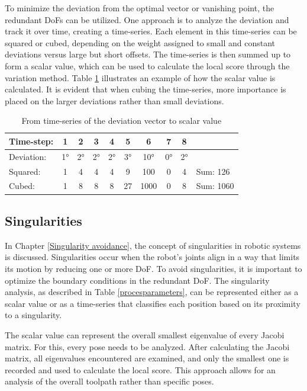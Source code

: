 To minimize the deviation from the optimal vector or vanishing point, the redundant \acrshort{DoF}s can be utilized. One approach is to analyze the deviation and track it over time, creating a time-series. Each element in this time-series can be squared or cubed, depending on the weight assigned to small and constant deviations versus large but short offsets. The time-series is then summed up to form a scalar value, which can be used to calculate the local score through the variation method. Table \ref{deviation} illustrates an example of how the scalar value is calculated. It is evident that when cubing the time-series, more importance is placed on the larger deviations rather than small deviations.


\begin{table}[H]
	\centering
	\begin{tabular}{||l|c|c|c|c|c|c|c|c|l||}
		\hline
		Time-step:  & 1 & 2& 3& 4& 5& 6& 7& 8&  \\
		\hline
		Deviation:  & 1° & 2°& 2°& 2°& 3°& 10°& 0°& 2°&  \\
		\hline
		\hline
		Squared:  & 1 & 4& 4& 4& 9& 100& 0& 4& Sum: 126  \\
		Cubed:  & 1 & 8& 8& 8& 27& 1000& 0& 8& Sum: 1060  \\
		\hline
		\hline
		
	\end{tabular}
	
	\caption{From time-series of the deviation vector to scalar value}
	\label{deviation}
\end{table}

 

\subsection{Singularities}

In Chapter \ref{Singularity avoidance}, the concept of singularities in robotic systems is discussed. Singularities occur when the robot's joints align in a way that limits its motion by reducing one or more \acrshort{DoF}. To avoid singularities, it is important to optimize the boundary conditions in the redundant \acrshort{DoF}. The singularity analysis, as described in Table \ref{procesparameters}, can be represented either as a scalar value or as a time-series that classifies each position based on its proximity to a singularity.

The scalar value can represent the overall smallest eigenvalue of every Jacobi matrix. For this, every pose needs to be analyzed. After calculating the Jacobi matrix, all eigenvalues encountered are examined, and only the smallest one is recorded and used to calculate the local score. This approach allows for an analysis of the overall toolpath rather than specific poses.

